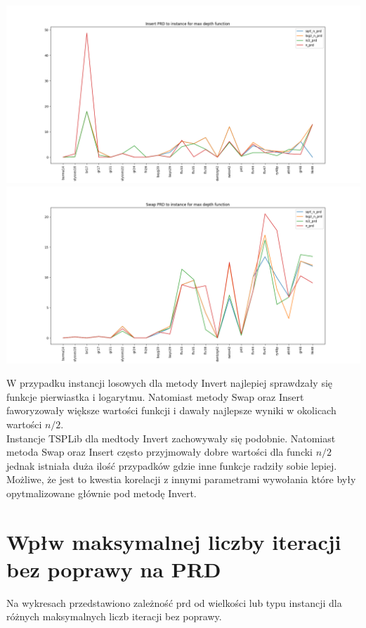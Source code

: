 \documentclass{article}
\begin{document}
\begin{multicols}{2}
\begin{center}
      \includegraphics[scale=0.2]{depth_ins_prd.png}
      \includegraphics[scale=0.2]{depth_swp_prd.png}
    \end{center}
  \end{multicols}

W przypadku instancji losowych dla metody Invert najlepiej sprawdzały się funkcje
pierwiastka i logarytmu. Natomiast metody Swap oraz Insert faworyzowały większe wartości
funkcji i dawały najlepsze wyniki w okolicach wartości $n/2$.\\

Instancje TSPLib dla medtody Invert zachowywały się podobnie. Natomiast metoda Swap oraz
Insert często przyjmowały dobre wartości dla funcki $n/2$ jednak istniała duża ilość przypadków
gdzie inne funkcje radziły sobie lepiej. Możliwe, że jest to kwestia korelacji z innymi parametrami
wywołania które były opytmalizowane głównie pod metodę Invert.

\section{Wpłw maksymalnej liczby iteracji bez poprawy na PRD}

Na wykresach przedstawiono zależność prd od wielkości lub typu instancji dla różnych maksymalnych liczb iteracji bez poprawy.
\end{document}
